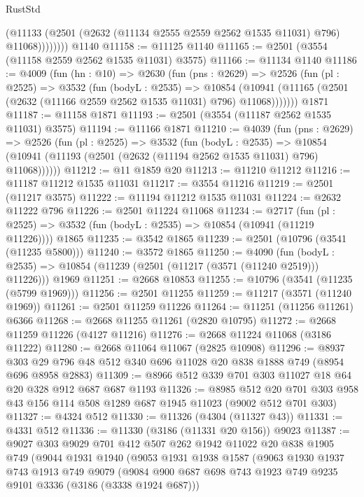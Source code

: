 \begin{lexlean}{RustStd}
\begin{coremodule}
                (@11133 (@2501 (@2632 (@11134 @2555 @2559 @2562 @1535 @11031) @796) @11068))))))))
    @1140
@11158 := @11125 @1140
@11165 := @2501 (@3554 (@11158 @2559 @2562 @1535 @11031) @3575)
@11166 := @11134 @1140
@11186 := @4009
    (fun (hn : @10) =>
    @2630
      (fun (pns : @2629) =>
      @2526
        (fun (pl : @2525) =>
        @3532
          (fun (bodyL : @2535) =>
          @10854 (@10941 (@11165 (@2501 (@2632 (@11166 @2559 @2562 @1535 @11031) @796) @11068)))))))
    @1871
@11187 := @11158 @1871
@11193 := @2501 (@3554 (@11187 @2562 @1535 @11031) @3575)
@11194 := @11166 @1871
@11210 := @4039
    (fun (pns : @2629) =>
    @2526
      (fun (pl : @2525) =>
      @3532
        (fun (bodyL : @2535) =>
        @10854 (@10941 (@11193 (@2501 (@2632 (@11194 @2562 @1535 @11031) @796) @11068))))))
@11212 := @11 @1859 @20
@11213 := @11210 @11212
@11216 := @11187 @11212 @1535 @11031
@11217 := @3554 @11216
@11219 := @2501 (@11217 @3575)
@11222 := @11194 @11212 @1535 @11031
@11224 := @2632 @11222 @796
@11226 := @2501 @11224 @11068
@11234 := @2717
    (fun (pl : @2525) => @3532 (fun (bodyL : @2535) => @10854 (@10941 (@11219 @11226))))
    @1865
@11235 := @3542 @1865
@11239 := @2501 (@10796 (@3541 (@11235 @5800)))
@11240 := @3572 @1865
@11250 := @4090
    (fun (bodyL : @2535) => @10854 (@11239 (@2501 (@11217 (@3571 (@11240 @2519))) @11226)))
    @1969
@11251 := @2668 @10853
@11255 := @10796 (@3541 (@11235 (@5799 @1969)))
@11256 := @2501 @11255
@11259 := @11217 (@3571 (@11240 @1969))
@11261 := @2501 @11259 @11226
@11264 := @11251 (@11256 @11261) @6366
@11268 := @2668 @11255 @11261 (@2820 @10795)
@11272 := @2668 @11259 @11226 (@4127 @11216)
@11276 := @2668 @11224 @11068 (@3186 @11222)
@11280 := @2668 @11064 @11067 (@2825 @10908)
@11296 := @8937 @303 @29 @796 @48 @512 @340 @696 @11028 @20 @838 @1888 @749 (@8954 @696 @8958 @2883)
@11309 := @8966 @512 @339 @701 @303 @11027 @18 @64 @20 @328 @912 @687 @687 @1193
@11326 := @8985
    @512
    @20
    @701
    @303
    @958
    @43
    @156
    @114
    @508
    @1289
    @687
    @1945
    @11023
    (@9002 @512 @701 @303)
@11327 := @4324 @512
@11330 := @11326 (@4304 (@11327 @43))
@11331 := @4331 @512
@11336 := @11330 (@3186 (@11331 @20 @156)) @9023
@11387 := @9027
    @303
    @9029
    @701
    @412
    @507
    @262
    @1942
    @11022
    @20
    @838
    @1905
    @749
    (@9044
      @1931
      @1940
      (@9053
        @1931
        @1938
        @1587
        (@9063
          @1930
          @1937
          @743
          @1913
          @749
          @9079
          (@9084 @900 @687 @698 @743 @1923 @749 @9235 @9101 @3336 (@3186 (@3338 @1924 @687)))

\end{coremodule}
\end{lexlean}

